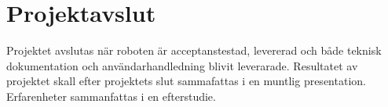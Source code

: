 \section{Projektavslut}

Projektet avslutas när roboten är acceptanstestad, levererad och både teknisk dokumentation och användarhandledning blivit leverarade. Resultatet av projektet skall efter projektets slut sammafattas i en muntlig presentation. Erfarenheter sammanfattas i en efterstudie.